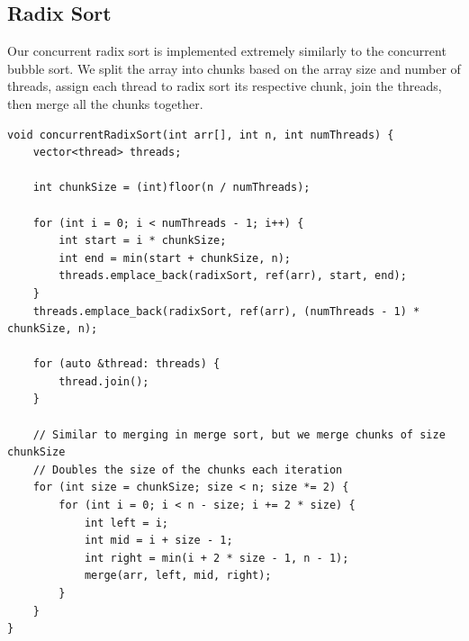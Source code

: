 \documentclass[conference]{IEEEtran}
\begin{document}
\subsection{Radix Sort}
Our concurrent radix sort is implemented extremely similarly to the concurrent bubble sort. We split the array into chunks based on the array size and number of threads, assign each thread to radix sort its respective chunk, join the threads, then merge all the chunks together.
\\
\begin{lstlisting}
void concurrentRadixSort(int arr[], int n, int numThreads) {
    vector<thread> threads;

    int chunkSize = (int)floor(n / numThreads);

    for (int i = 0; i < numThreads - 1; i++) {
        int start = i * chunkSize;
        int end = min(start + chunkSize, n);
        threads.emplace_back(radixSort, ref(arr), start, end);
    }
    threads.emplace_back(radixSort, ref(arr), (numThreads - 1) * chunkSize, n);
    
    for (auto &thread: threads) {
        thread.join();
    }

    // Similar to merging in merge sort, but we merge chunks of size chunkSize
    // Doubles the size of the chunks each iteration
    for (int size = chunkSize; size < n; size *= 2) {
        for (int i = 0; i < n - size; i += 2 * size) {
            int left = i;
            int mid = i + size - 1;
            int right = min(i + 2 * size - 1, n - 1);
            merge(arr, left, mid, right);
        }
    }
}
\end{lstlisting}
\end{document}
